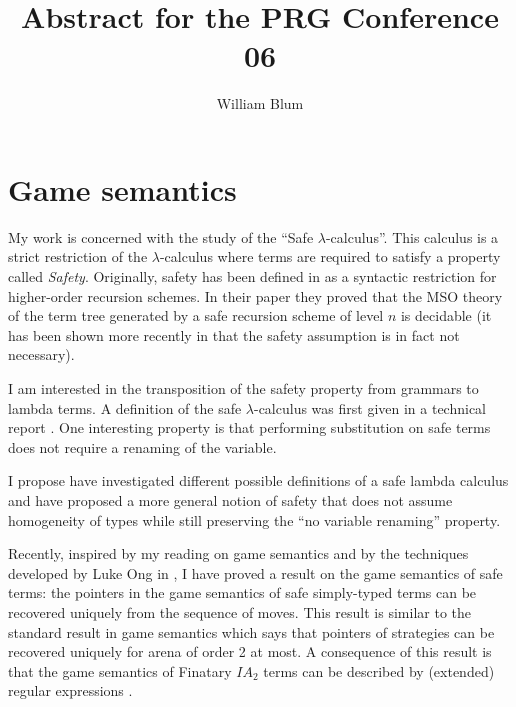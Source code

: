 \documentclass[12pt]{article}
\author{William Blum}
\title{Abstract for the PRG Conference 06}
\begin{document}
\maketitle

\section{Game semantics}

My work is concerned with the study of the ``Safe
$\lambda$-calculus''. This calculus is a strict restriction of the
$\lambda$-calculus where terms are required to satisfy a property
called \emph{Safety}. Originally, safety has been defined in
\cite{KNU02} as a syntactic restriction for higher-order recursion
schemes. In their paper they proved that the MSO theory of the term
tree generated by a safe recursion scheme of level $n$ is decidable
(it has been shown more recently in \cite{OngLics2006} that the
safety assumption is in fact not necessary).

I am interested in the transposition of the safety property from
grammars to lambda terms. A definition of the safe
$\lambda$-calculus was first given in a technical report
\citep{safety-mirlong2004}. One interesting property is that
performing substitution on safe terms does not require a renaming of
the variable.

I propose have investigated different possible definitions of a safe
lambda calculus and have proposed a more general notion of safety
that does not assume homogeneity of types while still preserving the
``no variable renaming'' property.



Recently, inspired by my reading on game semantics
\citep{abramsky:game-semantics-tutorial} and by the techniques
developed by Luke Ong in \citep{OngLics2006}, I have proved a result
on the game semantics of safe terms: the pointers in the game
semantics of safe simply-typed terms can be recovered uniquely from
the sequence of moves. This result is similar to the standard result
in game semantics which says that pointers of strategies can be
recovered uniquely for arena of order 2 at most. A consequence of
this result is that the game semantics of Finatary $IA_2$ terms can
be described by (extended) regular expressions
\cite{ghicamccusker00}.




\end{document}
